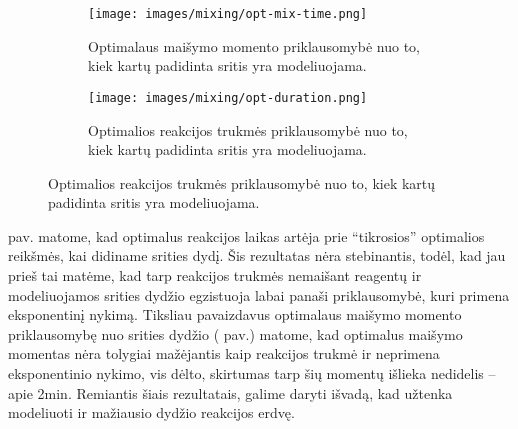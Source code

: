 \begin{figure}[htbp]
  \centering
  \begin{subfigure}[t]{0.48\textwidth}
    \centering
    \texttt{[image: images/mixing/opt-mix-time.png]}
    \caption{Optimalaus maišymo momento priklausomybė nuo to, kiek kartų padidinta sritis yra modeliuojama. }
    \label{fig:optimal-mix-time-order-dependance}
  \end{subfigure}
  \hfill
  \begin{subfigure}[t]{0.48\textwidth}
    \centering
    \texttt{[image: images/mixing/opt-duration.png]}
    \caption{Optimalios reakcijos trukmės priklausomybė nuo to, kiek kartų padidinta sritis yra modeliuojama. }
    \label{fig:optimal-duration-order-dependance}
  \end{subfigure}
\end{figure}

 pav. matome, kad optimalus reakcijos laikas artėja prie \enquote{tikrosios} optimalios reikšmės, kai didiname srities dydį. Šis rezultatas nėra stebinantis, todėl, kad jau prieš tai matėme, kad tarp reakcijos trukmės nemaišant reagentų ir modeliuojamos srities dydžio egzistuoja labai panaši priklausomybė, kuri primena eksponentinį nykimą. Tiksliau pavaizdavus optimalaus maišymo momento priklausomybę nuo srities dydžio ( pav.) matome, kad optimalus maišymo momentas nėra tolygiai mažėjantis kaip reakcijos trukmė ir neprimena eksponentinio nykimo, vis dėlto, skirtumas tarp šių momentų išlieka nedidelis -- apie 2min. Remiantis šiais rezultatais, galime daryti išvadą, kad užtenka modeliuoti ir mažiausio dydžio reakcijos erdvę.

